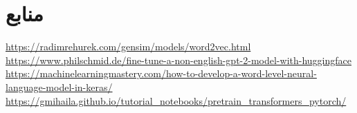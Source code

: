 \documentclass[10pt]{article}
\begin{document}
\newpage

\section{منابع}

\begin{flushleft}
	\url{https://radimrehurek.com/gensim/models/word2vec.html}
	\url{https://www.philschmid.de/fine-tune-a-non-english-gpt-2-model-with-huggingface}
	\url{https://machinelearningmastery.com/how-to-develop-a-word-level-neural-language-model-in-keras/}
	\url{https://gmihaila.github.io/tutorial_notebooks/pretrain_transformers_pytorch/}
\end{flushleft}
\end{document}

